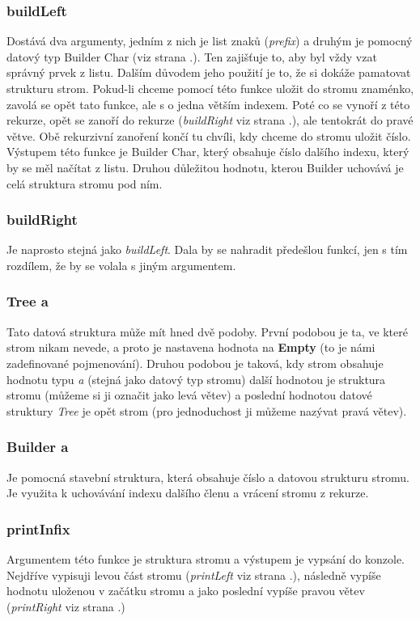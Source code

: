 \documentclass[12pt,a4paper]{report}
\begin{document}
\subsubsection{buildLeft} \label{buildLeft}
Dostává dva argumenty, jedním z nich je list znaků (\textit{prefix}) a druhým je pomocný datový typ Builder Char (viz strana \pageref{Builder}.). Ten zajišťuje to, aby byl vždy vzat správný prvek z listu. Dalším důvodem jeho použití je to, že si dokáže pamatovat strukturu strom. Pokud-li chceme pomocí této funkce uložit do stromu znaménko, zavolá se opět tato funkce, ale s o jedna větším indexem. Poté co se vynoří z této rekurze, opět se zanoří do rekurze (\textit{buildRight} viz strana \pageref{buildRight}.), ale tentokrát do pravé větve. Obě rekurzivní zanoření končí tu chvíli, kdy chceme do stromu uložit číslo. 
Výstupem této funkce je Builder Char, který obsahuje číslo dalšího indexu, který by se měl načítat z listu. Druhou důležitou hodnotu, kterou Builder uchovává je celá struktura stromu pod ním.   
\subsubsection{buildRight} \label{buildRight}
Je naprosto stejná jako \textit{buildLeft}. Dala by se nahradit předešlou funkcí, jen s tím rozdílem, že by se volala s jiným argumentem. 
\subsubsection{Tree a}
Tato datová struktura může mít hned dvě podoby. První podobou je ta, ve které strom nikam nevede, a proto je nastavena hodnota na \textbf{Empty} (to je námi zadefinované pojmenování). Druhou podobou je taková, kdy strom obsahuje hodnotu typu \textit{a} (stejná jako datový typ stromu) další hodnotou je struktura stromu (můžeme si ji označit jako levá větev) a poslední hodnotou datové struktury \textit{Tree} je opět strom (pro jednoduchost ji můžeme nazývat pravá větev).

\subsubsection{Builder a} \label{Builder}
Je pomocná stavební struktura, která obsahuje číslo a datovou strukturu stromu. Je využita k uchovávání indexu dalšího členu a vrácení stromu z rekurze.
\subsubsection{printInfix} \label{printInfix} 
Argumentem této funkce je struktura stromu a výstupem je vypsání do konzole. Nejdříve vypisuji levou část stromu (\textit{printLeft} viz strana \pageref{printLeft}.), následně vypíše hodnotu uloženou v začátku stromu a jako poslední vypíše pravou větev (\textit{printRight} viz strana \pageref{printRight}.)
\end{document}

